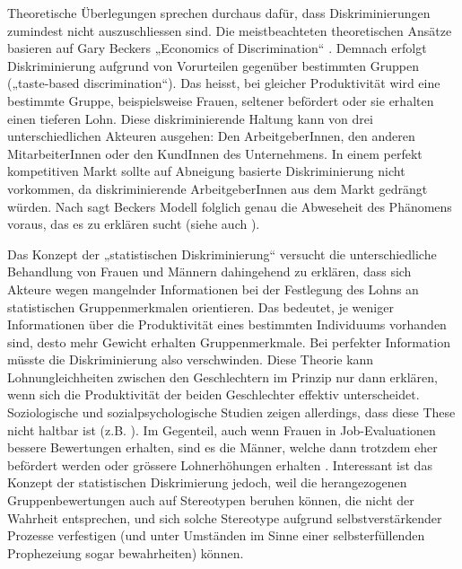 \documentclass[a4paper,12pt]{article}
\begin{document}
Theoretische Überlegungen sprechen durchaus dafür, dass Diskriminierungen zumindest nicht auszuschliessen sind. Die meistbeachteten theoretischen Ansätze basieren auf Gary
Beckers „Economics of Discrimination“ \citep{Becker-1973}. Demnach erfolgt Diskriminierung aufgrund von Vorurteilen gegenüber bestimmten Gruppen („taste-based discrimination“). Das heisst, bei gleicher Produktivität wird eine bestimmte Gruppe, beispielsweise Frauen, seltener befördert oder sie erhalten einen tieferen Lohn. Diese diskriminierende Haltung kann von drei unterschiedlichen Akteuren ausgehen: Den ArbeitgeberInnen, den anderen MitarbeiterInnen oder den KundInnen des Unternehmens. In einem perfekt kompetitiven Markt sollte auf Abneigung basierte Diskriminierung nicht vorkommen, da diskriminierende ArbeitgeberInnen aus dem Markt gedrängt würden. Nach \cite{Arrow-1972} sagt Beckers Modell folglich genau die Abweseheit des Phänomens voraus, das es zu erklären sucht (siehe auch  \citealp{Guryan-2013}).

Das Konzept der „statistischen Diskriminierung“ \citep{Arrow-1972,Phelps-1972} versucht
die unterschiedliche Behandlung von Frauen und Männern dahingehend zu erklären,
dass sich Akteure wegen mangelnder Informationen bei der Festlegung des Lohns
an statistischen Gruppenmerkmalen orientieren. Das bedeutet, je weniger Informationen über die Produktivität eines bestimmten Individuums vorhanden sind, desto mehr Gewicht erhalten Gruppenmerkmale. Bei perfekter Information müsste die Diskriminierung also verschwinden. Diese Theorie kann
Lohnungleichheiten zwischen den Geschlechtern im Prinzip nur dann erklären, wenn
sich die Produktivität der beiden Geschlechter effektiv unterscheidet. Soziologische und
sozialpsychologische Studien zeigen allerdings, dass diese These nicht haltbar
ist (z.B. \citealp{Bielby-Bielby-1988}). Im Gegenteil, auch wenn Frauen in
Job-Evaluationen bessere Bewertungen erhalten, sind es die Männer, welche dann
trotzdem eher befördert werden \citep{Blau-DeVaro-2007} oder grössere
Lohnerhöhungen erhalten \citep{Castilla-2012}. Interessant ist das Konzept der 
statistischen Diskrimierung jedoch, weil die herangezogenen Gruppenbewertungen auch auf 
Stereotypen beruhen können, die nicht der Wahrheit 
entsprechen, und sich solche Stereotype aufgrund selbstverstärkender Prozesse 
verfestigen (und unter Umständen im Sinne einer selbsterfüllenden Prophezeiung 
sogar bewahrheiten) können.
\end{document}
